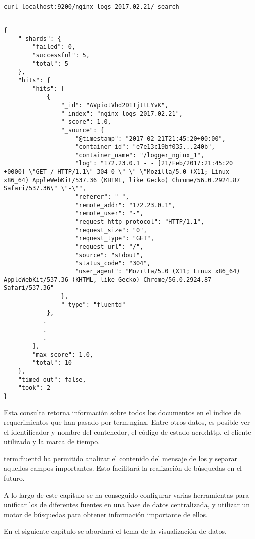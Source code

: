 \begin{lstlisting}

curl localhost:9200/nginx-logs-2017.02.21/_search

\end{lstlisting}

\begin{lstlisting}

{
    "_shards": {
        "failed": 0,
        "successful": 5,
        "total": 5
    },
    "hits": {
        "hits": [
            {
                "_id": "AVpiotVhd2D1TjttLYvK",
                "_index": "nginx-logs-2017.02.21",
                "_score": 1.0,
                "_source": {
                    "@timestamp": "2017-02-21T21:45:20+00:00",
                    "container_id": "e7e13c19bf035...240b",
                    "container_name": "/logger_nginx_1",
                    "log": "172.23.0.1 - - [21/Feb/2017:21:45:20 +0000] \"GET / HTTP/1.1\" 304 0 \"-\" \"Mozilla/5.0 (X11; Linux x86_64) AppleWebKit/537.36 (KHTML, like Gecko) Chrome/56.0.2924.87 Safari/537.36\" \"-\"",
                    "referer": "-",
                    "remote_addr": "172.23.0.1",
                    "remote_user": "-",
                    "request_http_protocol": "HTTP/1.1",
                    "request_size": "0",
                    "request_type": "GET",
                    "request_url": "/",
                    "source": "stdout",
                    "status_code": "304",
                    "user_agent": "Mozilla/5.0 (X11; Linux x86_64) AppleWebKit/537.36 (KHTML, like Gecko) Chrome/56.0.2924.87 Safari/537.36"
                },
                "_type": "fluentd"
            },
           .
           .
           .
        ],
        "max_score": 1.0,
        "total": 10
    },
    "timed_out": false,
    "took": 2
}

\end{lstlisting}

Esta consulta retorna información sobre todos los documentos en el índice
de requerimientos  que han pasado por \gls{term:nginx}. Entre
otros datos, es posible ver el identificador y nombre del contenedor, el código
de estado \gls{acro:http}, el cliente  utilizado y la marca de
tiempo.

\gls{term:fluentd} ha permitido analizar el contenido del mensaje de los
 y separar aquellos campos importantes. Esto facilitará la realización
de búsquedas en el futuro.

A lo largo de este capítulo se ha conseguido configurar varias herramientas
para unificar los  de diferentes fuentes en una base de datos
centralizada, y utilizar un motor de búsquedas para obtener información
importante de ellos.

En el siguiente capítulo se abordará el tema de la visualización de datos.
